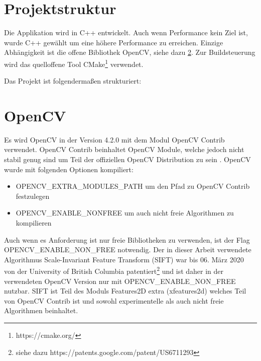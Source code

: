 \section{Projektstruktur}
Die Applikation wird in C++ entwickelt.
Auch wenn Performance kein Ziel ist, wurde C++ gewählt um eine höhere Performance zu erreichen.
Einzige Abhängigkeit ist die offene Bibliothek OpenCV, siehe dazu \ref{sec:opencv}.
Zur Buildsteuerung wird das quelloffene Tool CMake\footnote{https://cmake.org/} verwendet.

Das Projekt ist folgendermaßen strukturiert:



\section{OpenCV}\label{sec:opencv}
Es wird OpenCV in der Version 4.2.0 mit dem Modul OpenCV Contrib verwendet.
OpenCV Contrib beinhaltet OpenCV Module, welche jedoch nicht stabil genug sind um Teil der offiziellen OpenCV Distribution zu sein \cite[README.md]{opencv_2013}.
OpenCV wurde mit folgenden Optionen kompiliert:
\begin{itemize}
	\item OPENCV\_EXTRA\_MODULES\_PATH um den Pfad zu OpenCV Contrib festzulegen
	\item OPENCV\_ENABLE\_NONFREE um auch nicht freie Algorithmen zu kompilieren
\end{itemize}
Auch wenn es Anforderung ist nur freie Bibliotheken zu verwenden, ist der Flag OPENCV\_ENABLE\_NON\_FREE notwendig.
Der in dieser Arbeit verwendete Algorithmus Scale-Invariant Feature Transform (SIFT) war bis 06. März 2020 von der University of British Columbia patentiert\footnote{siehe dazu https://patents.google.com/patent/US6711293} und ist daher in der verwendeten OpenCV Version nur mit OPENCV\_ENABLE\_NON\_FREE nutzbar.
SIFT ist Teil des Moduls Features2D extra (xfeatures2d) welches Teil von OpenCV Contrib ist und sowohl experimentelle als auch nicht freie Algorithmen beinhaltet.

